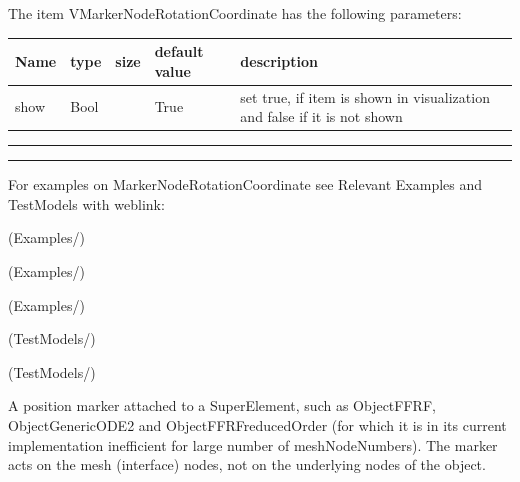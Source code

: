 \noindent The item VMarkerNodeRotationCoordinate has the following parameters:
\begin{center}
  \footnotesize
  \begin{longtable}{| p{4.5cm} | p{2.5cm} | p{0.5cm} | p{2.5cm} | p{6cm} |}
    \hline
    \bf Name & \bf type & \bf size & \bf default value & \bf description \\ \hline
    show &     Bool &      &     True &     set true, if item is shown in visualization and false if it is not shown\\ \hline
\end{longtable}
\end{center}
\par\noindent\rule{\textwidth}{0.4pt}
\label{description_MarkerNodeRotationCoordinate}
\vspace{6pt}\par\noindent\rule{\textwidth}{0.4pt}
%
\noindent For examples on MarkerNodeRotationCoordinate see Relevant Examples and TestModels with weblink:
\bi
\item {} (Examples/)
\item {} (Examples/)
\item {} (Examples/)
\item {} (TestModels/)
\item {} (TestModels/)

\ei

%
\newpage


\label{sec:item:MarkerSuperElementPosition}
A position marker attached to a SuperElement, such as ObjectFFRF, ObjectGenericODE2 and ObjectFFRFreducedOrder (for which it is in its current implementation inefficient for large number of meshNodeNumbers). The marker acts on the mesh (interface) nodes, not on the underlying nodes of the object.
\vspace{12pt}\\

